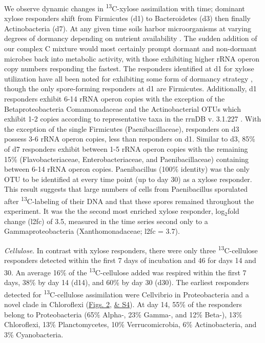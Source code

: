 We observe dynamic changes in \textsuperscript{13}C-xylose assimilation with time; dominant xylose responders shift from Firmicutes (d1) to Bacteroidetes (d3) then finally Actinobacteria (d7). At any given time soils harbor microorganisms at varying degrees of dormancy depending on nutrient availability \cite{Jones_2010}. The sudden addition of our complex C mixture would most certainly prompt dormant and non-dormant microbes back into metabolic activity, with those exhibiting higher rRNA operon copy numbers responding the fastest. The responders identified at d1 for xylose utilization have all been noted for exhibiting some form of dormancy strategy \cite{Jones_2010, Mulyukin_2009, Darcy_2011, Sachidanandham_2008, Finkel_2006, Rittershaus_2013, Tada_2013, Lay_2013}, though the only spore-forming responders at d1 are Firmicutes. Additionally, d1 responders exhibit 6-14 rRNA operon copies with the exception of the Betaproteobacteria Comamonadaceae and the Actinobacterial OTUs which exhibit 1-2 copies according to representative taxa in the rrnDB v. 3.1.227 \cite{18948294,11125085}. With the exception of the single Firmicutes (Paenibacillaceae), responders on d3 possess 3-6 rRNA operon copies, less than responders on d1. Similar to d3, 85\% of d7 responders exhibit between 1-5 rRNA operon copies with the remaining 15\% (Flavobacteriaceae, Enterobacteriaceae, and Paenibacillaceae) containing between 6-14 rRNA operon copies. Paenibacillus (100\% identity) was the only OTU to be identified at every time point (up to day 30) as a xylose responder. This result suggests that large numbers of cells from Paenibacillus sporulated after \textsuperscript{13}C-labeling of their DNA and that these spores remained throughout the experiment. It was the the second most enriched xylose responder, log\text$_{2}$fold change (l2fc) of 3.5, measured in the time series second only to a Gammaproteobacteria (Xanthomonadaceae; l2fc = 3.7).


\textit{Cellulose}. In contrast with xylose responders, there were only three \textsuperscript{13}C-cellulose responders detected within the first 7 days of incubation and 46 for days 14 and 30. An average 16\% of the \textsuperscript{13}C-cellulose added was respired within the first 7 days, 38\% by day 14 (d14), and 60\% by day 30 (d30). The earliest responders detected for \textsuperscript{13}C-cellulose assimilation were Cellvibrio in Proteobacteria and a novel clade in Chloroflexi (\href{https://www.authorea.com/users/3537/articles/3612/master/file/figures/l2fc_fig1/l2fc_fig.pdf}{Figs. 2}, \href{https://authorea.com/users/3537/articles/8459/master/file/figures/l2fc_fig_pVal/l2fc_fig_pVal.png}{& S4}). At day 14, 55\% of the responders belong to Proteobacteria (65\% Alpha-, 23\% Gamma-, and 12\% Beta-), 13\% Chloroflexi, 13\% Planctomycetes, 10\% Verrucomicrobia, 6\% Actinobacteria, and 3\% Cyanobacteria.

